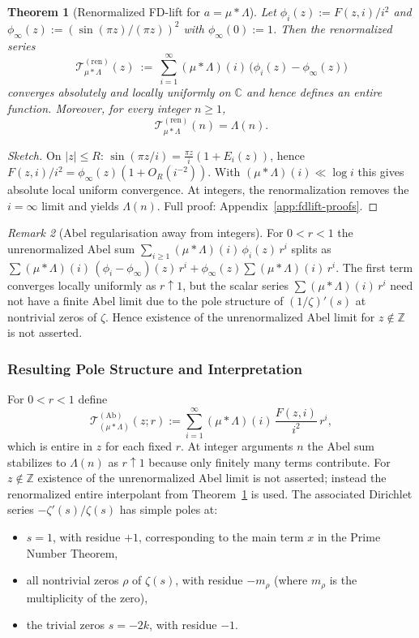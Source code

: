 \documentclass[11pt,a4paper]{amsart}
\newcommand{\C}{\mathbb{C}}
\theoremstyle{plain}
\newtheorem{theorem}{Theorem}[section]
\theoremstyle{definition}
\theoremstyle{remark}
\newtheorem{remark}[theorem]{Remark}
\begin{document}
\begin{theorem}[Renormalized FD-lift for $a=\mu*\Lambda$]\label{thm:renormalized-muLambda}
Let $\phi_i(z):=F(z,i)/i^2$ and $\phi_\infty(z):=(\sin(\pi z)/(\pi z))^2$ with $\phi_\infty(0):=1$. Then the renormalized series
\[
\mathcal{T}^{(\mathrm{ren})}_{\mu*\Lambda}(z)\ :=\ \sum_{i=1}^{\infty}(\mu*\Lambda)(i)\,\bigl(\phi_i(z)-\phi_\infty(z)\bigr)
\]
converges absolutely and locally uniformly on $\C$ and hence defines an entire function. Moreover, for every integer $n\ge1$,
\[
\mathcal{T}^{(\mathrm{ren})}_{\mu*\Lambda}(n)=\Lambda(n).
\]
\end{theorem}
\begin{proof}[Sketch]
On $|z|\le R$: $\sin(\pi z/i)=\frac{\pi z}{i}(1+E_i(z))$, hence $F(z,i)/i^2=\phi_\infty(z)(1+O_R(i^{-2}))$.
With $(\mu*\Lambda)(i)\ll\log i$ this gives absolute local uniform convergence.
At integers, the renormalization removes the $i=\infty$ limit and yields $\Lambda(n)$.
Full proof: Appendix~\ref{app:fdlift-proofs}.
\end{proof}


\begin{remark}[Abel regularisation away from integers]
For $0<r<1$ the unrenormalized Abel sum $\sum_{i\ge1}(\mu*\Lambda)(i)\,\phi_i(z)\,r^i$ splits as $\sum (\mu*\Lambda)(i)\,(\phi_i-\phi_\infty)(z)\,r^i+\phi_\infty(z)\sum (\mu*\Lambda)(i)\,r^i$. The first term converges locally uniformly as $r\uparrow1$, but the scalar series $\sum (\mu*\Lambda)(i)\,r^i$ need not have a finite Abel limit due to the pole structure of $(1/\zeta)'(s)$ at nontrivial zeros of $\zeta$. Hence existence of the unrenormalized Abel limit for $z\notin\mathbb Z$ is not asserted.
\end{remark}

\subsubsection{Resulting Pole Structure and Interpretation}
For $0<r<1$ define
\[
\mathcal{T}^{(\mathrm{Ab})}_{(\mu*\Lambda)}(z;r):=\sum_{i=1}^{\infty} (\mu*\Lambda)(i)\,\frac{F(z,i)}{i^2}\, r^i,
\]
which is entire in $z$ for each fixed $r$. At integer arguments $n$ the Abel sum stabilizes to $\Lambda(n)$ as $r\uparrow1$ because only finitely many terms contribute. For $z\notin\mathbb Z$ existence of the unrenormalized Abel limit is not asserted; instead the renormalized entire interpolant from Theorem~\ref{thm:renormalized-muLambda} is used. The associated Dirichlet series $-\zeta'(s)/\zeta(s)$ has simple poles at:
\begin{itemize}
    \item $s=1$, with residue $+1$, corresponding to the main term $x$ in the Prime Number Theorem,
    \item all nontrivial zeros $\rho$ of $\zeta(s)$, with residue $-m_\rho$ (where $m_\rho$ is the multiplicity of the zero),
    \item the trivial zeros $s=-2k$, with residue $-1$.
\end{itemize}
\end{document}
